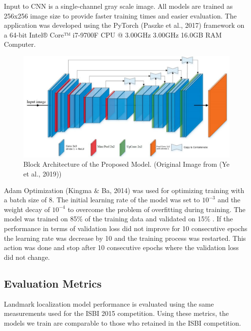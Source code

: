 \documentclass{elektr}
\begin{document}
Input to CNN is a single-channel gray scale image. All models are trained as 256x256 image size to provide faster training times and easier evaluation. The application was developed using the PyTorch (Paszke et al., 2017) framework on a 64-bit Intel® Core™ i7-9700F CPU @ 3.00GHz 3.00GHz 16.0GB RAM Computer. 



\begin{figure}[H]
	\begin{center}
		\includegraphics[width=5.76in]{./media/image3}
		\caption{Block Architecture of the Proposed Model. (Original Image from (Ye et al., 2019))}
		\label{fig2}
	\end{center}\vs{-4mm}
\end{figure}



Adam Optimization (Kingma $\&$  Ba, 2014) was used for optimizing training with a batch size of 8. The initial learning rate of the model was set to  \( 10^{-3} \)  and the weight decay of  \( 10^{-4} \)  to overcome the problem of overfitting during training. The model was trained on 85$\%$  of the training data and validated on 15$\%$ . If the performance in terms of validation loss did not improve for 10 consecutive epochs the learning rate was decrease by 10 and the training process was restarted. This action was done and stop after 10 consecutive epochs where the validation loss did not change.

\subsection{Evaluation Metrics}

\tab Landmark localization model performance is evaluated using the same measurements used for the ISBI 2015 competition. Using these metrics, the models we train are comparable to those who retained in the ISBI competition.
\end{document}
